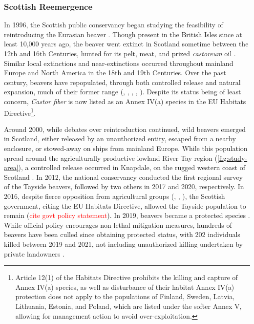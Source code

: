 \subsubsection{Scottish Reemergence}

In 1996, the Scottish public conservancy began studying the feasibility of reintroducing the Eurasian beaver \citep{kitchener_history_1997}. Though present in the British Isles since at least 10,000 years ago, the beaver went extinct in Scotland sometime between the 12th and 16th Centuries, hunted for its pelt, meat, and prized \textit{castoreum} oil \citep{kitchener_history_1997}. Similar local extinctions and near-extinctions occurred throughout mainland Europe and North America in the 18th and 19th Centuries. Over the past century, beavers have repopulated, through both controlled release and natural expansion, much of their former range (\cite{dzieciolowski_reintroduction_1999}, \cite{janiszewski_restoration_2021}, \cite{schwab_beaver_2003}, \cite{hartman_patterns_1995}, \cite{dijkstra_reintroduction_1999}). Despite its status being of least concern, \textit{Castor fiber} is now listed as an Annex IV(a) species in the EU Habitats Directive\footnote{Article 12(1) of the Habitats Directive prohibits the killing and capture of Annex IV(a) species, as well as disturbance of their habitat \citep{noauthor_council_2013} Annex IV(a) protection does not apply to the populations of Finland, Sweden, Latvia, Lithuania, Estonia, and Poland, which are listed under the softer Annex V, allowing for management action to avoid over-exploitation.}. 

Around 2000, while debates over reintroduction continued, wild beavers emerged in Scotland, either released by an unauthorized entity, escaped from a nearby enclosure, or stowed-away on ships from mainland Europe. While this population spread around the agriculturally productive lowland River Tay region (\ref{fig:study-area}), a controlled release occurred in Knapdale, on the rugged western coast of Scotland \citep{campbell-palmer_managing_2015}. In 2012, the national conservancy conducted the first regional survey of the Tayside beavers, followed by two others in 2017 and 2020, respectively. In 2016, despite fierce opposition from agricultural groups (\cite{castle_beavers_2021}, \cite{kennedy_nfu_2023}, \cite{werth_christopher_beavers_2017}), the Scottish government, citing the EU Habitats Directive, allowed the Tayside population to remain (\textcolor{red}{cite govt policy statement}). In 2019, beavers became a protected species \citep{noauthor_beavers_2019}. While official policy encourages non-lethal mitigation measures, hundreds of beavers have been culled since obtaining protected status, with 202 individuals killed between 2019 and 2021, not including unauthorized killing undertaken by private landowners \citep{williams_more_2021}. 

